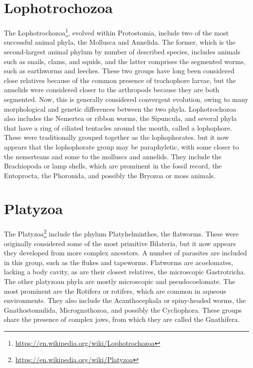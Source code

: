 \documentclass[]{book}
\let\rmarkdownfootnote\footnote%
\def\footnote{\protect\rmarkdownfootnote}
\renewcommand{\href}[2]{#2\footnote{\url{#1}}}
\theoremstyle{definition}
\theoremstyle{definition}
\theoremstyle{definition}
\theoremstyle{remark}
\begin{document}
\section{Lophotrochozoa}\label{lophotrochozoa}

The \href{https://en.wikipedia.org/wiki/Lophotrochozoa}{Lophotrochozoa},
evolved within Protostomia, include two of the most successful animal
phyla, the Mollusca and Annelida. The former, which is the
second-largest animal phylum by number of described species, includes
animals such as snails, clams, and squids, and the latter comprises the
segmented worms, such as earthworms and leeches. These two groups have
long been considered close relatives because of the common presence of
trochophore larvae, but the annelids were considered closer to the
arthropods because they are both segmented. Now, this is generally
considered convergent evolution, owing to many morphological and genetic
differences between the two phyla. Lophotrochozoa also includes the
Nemertea or ribbon worms, the Sipuncula, and several phyla that have a
ring of ciliated tentacles around the mouth, called a lophophore. These
were traditionally grouped together as the lophophorates. but it now
appears that the lophophorate group may be paraphyletic, with some
closer to the nemerteans and some to the molluscs and annelids. They
include the Brachiopoda or lamp shells, which are prominent in the
fossil record, the Entoprocta, the Phoronida, and possibly the Bryozoa
or moss animals.

\section{Platyzoa}\label{platyzoa}

The \href{https://en.wikipedia.org/wiki/Platyzoa}{Platyzoa} include the
phylum Platyhelminthes, the flatworms. These were originally considered
some of the most primitive Bilateria, but it now appears they developed
from more complex ancestors. A number of parasites are included in this
group, such as the flukes and tapeworms. Flatworms are acoelomates,
lacking a body cavity, as are their closest relatives, the microscopic
Gastrotricha. The other platyzoan phyla are mostly microscopic and
pseudocoelomate. The most prominent are the Rotifera or rotifers, which
are common in aqueous environments. They also include the Acanthocephala
or spiny-headed worms, the Gnathostomulida, Micrognathozoa, and possibly
the Cycliophora. These groups share the presence of complex jaws, from
which they are called the Gnathifera. 
\end{document}
